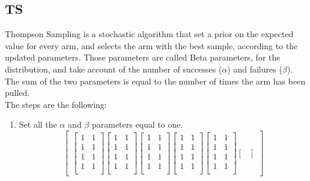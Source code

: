 \subsection{TS}
Thompson Sampling is a stochastic algorithm that set a prior on the expected value for every arm, and selects the arm with the best sample, according to the updated parameters. Those parameters are called Beta parameters, for the distribution, and take account of the number of successes ($\alpha$) and failures ($\beta$). The sum of the two parameters is equal to the number of times the arm has been pulled.\\The steps are the following:
\begin{enumerate}
    \item Set all the $\alpha$ and $\beta$ parameters equal to one. \[\begin{bmatrix}
    \begin{bmatrix}
        1 & 1\\
        1 & 1\\
        1 & 1\\
        1 & 1\\
    \end{bmatrix}
    \begin{bmatrix}
        1 & 1\\
        1 & 1\\
        1 & 1\\
        1 & 1\\
    \end{bmatrix}
    \begin{bmatrix}
        1 & 1\\
        1 & 1\\
        1 & 1\\
        1 & 1\\
    \end{bmatrix}
    \begin{bmatrix}
        1 & 1\\
        1 & 1\\
        1 & 1\\
        1 & 1\\
    \end{bmatrix}
    \begin{bmatrix}
        1 & 1\\
        1 & 1\\
        1 & 1\\
        1 & 1\\
    \end{bmatrix}
    \begin{bmatrix}

\end{bmatrix}
\end{bmatrix}\]
\end{enumerate}
